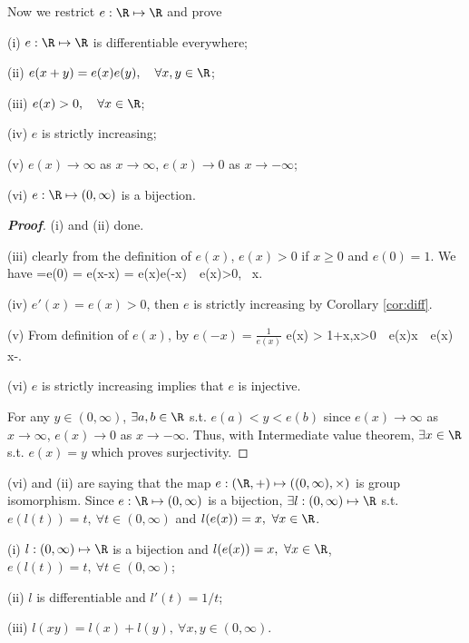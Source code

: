 Now we restrict $e:\R\mapsto \R$ and prove

\begin{theorem}
(i) $e:\R\mapsto\R$ is differentiable everywhere;

(ii) $e(x+y) = e(x)e(y),\quad \forall x,y \in\R$;

(iii) $e(x)>0, \quad \forall x\in\R$;

(iv) $e$ is strictly increasing;

(v) $e(x)\to \infty$ as $x\to\infty$, $e(x)\to 0$ as $x\to -\infty$;

(vi) $e:\R\mapsto (0,\infty)$ is a bijection.
\end{theorem}

\begin{proof}[{\bf Proof}]
(i) and (ii) done.

(iii) clearly from the definition of $e(x)$, $e(x)>0$ if $x\geq 0$ and $e(0)=1$. We have
=e(0) = e(x-x) = e(x)e(-x)\ \ra \ e(x)>0, \ \forall x\in\R.
\ee

(iv) $e'(x) = e(x)>0$, then $e$ is strictly increasing by Corollary \ref{cor:diff}.

(v) From definition of $e(x)$, by $e(-x) = \frac 1{e(x)}$
\be
e(x) > 1+x,\quad x>0\ \ra \ e(x)\to \infty {}x\to\infty \ \ra \ e(x) x\to-\infty.
\ee

(vi) $e$ is strictly increasing implies that $e$ is injective. 

For any $y\in (0,\infty)$, $\exists a,b\in \R$ s.t. $e(a)<y<e(b)$ since $e(x)\to \infty$ as $x\to\infty$, $e(x)\to 0$ as $x\to -\infty$. Thus, with Intermediate value theorem, $\exists x\in\R$ s.t. $e(x)=y$ which proves surjectivity.
\end{proof}

\begin{remark}
(vi) and (ii) are saying that the map $e:(\R,+)\mapsto ((0,\infty),\times)$ is group isomorphism. Since $e:\R\mapsto(0,\infty)$ is a bijection, $\exists l:(0,\infty)\mapsto \R$ s.t. $e(l(t))=t,\ \forall t\in(0,\infty)$ and $l(e(x))=x,\ \forall x\in\R$.
\end{remark}

\begin{theorem}
(i) $l: (0,\infty)\mapsto \R$ is a bijection and $l(e(x))=x,\ \forall x\in\R$, $e(l(t))=t,\ \forall t\in(0,\infty)$;

(ii) $l$ is differentiable and $l'(t)=1/t$;

(iii) $l(xy) = l(x) + l(y),\ \forall x,y\in(0,\infty)$. 
\end{theorem}

